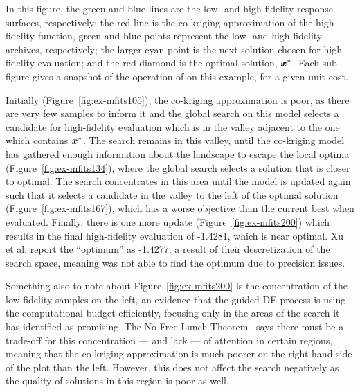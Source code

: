 In this figure, the green and blue lines are the low- and high-fidelity response surfaces, respectively; the red line is the co-kriging approximation of the high-fidelity function, green and blue points represent the low- and high-fidelity archives, respectively; the larger cyan point is the next solution chosen for high-fidelity evaluation; and the red diamond is the optimal solution, $\boldsymbol{x}^*$. Each sub-figure gives a snapshot of the operation of \AlgName{} on this example, for a given unit cost.

Initially (Figure~\ref{fig:ex-mfits105}), the co-kriging approximation is poor, as there are very few samples to inform it and the global search on this model selects a candidate for high-fidelity evaluation which is in the valley adjacent to the one which contains $\boldsymbol{x}^*$. The search remains in this valley, until the co-kriging model has gathered enough information about the landscape to escape the local optima (Figure~\ref{fig:ex-mfits134}), where the global search selects a solution that is closer to optimal. The search concentrates in this area until the model is updated again such that it selects a candidate in the valley to the left of the optimal solution (Figure~\ref{fig:ex-mfits167}), which has a worse objective than the current best when evaluated. Finally, there is one more update (Figure~\ref{fig:ex-mfits200}) which results in the final high-fidelity evaluation of -1.4281, which is near optimal. Xu et al. report the ``optimum'' as -1.4277, a result of their descretization of the search space, meaning \motos{} was not able to find the optimum due to precision issues.

Something also to note about Figure~\ref{fig:ex-mfits200} is the concentration of the low-fidelity samples on the left, an evidence that the guided DE process is using the computational budget efficiently, focusing only in the areas of the search it has identified as promising. The No Free Lunch Theorem~\cite{wolpert1997no} says there must be a trade-off for this concentration --- and lack --- of attention in certain regions, meaning that the co-kriging approximation is much poorer on the right-hand side of the plot than the left. However, this does not affect the search negatively as the quality of solutions in this region is poor as well.